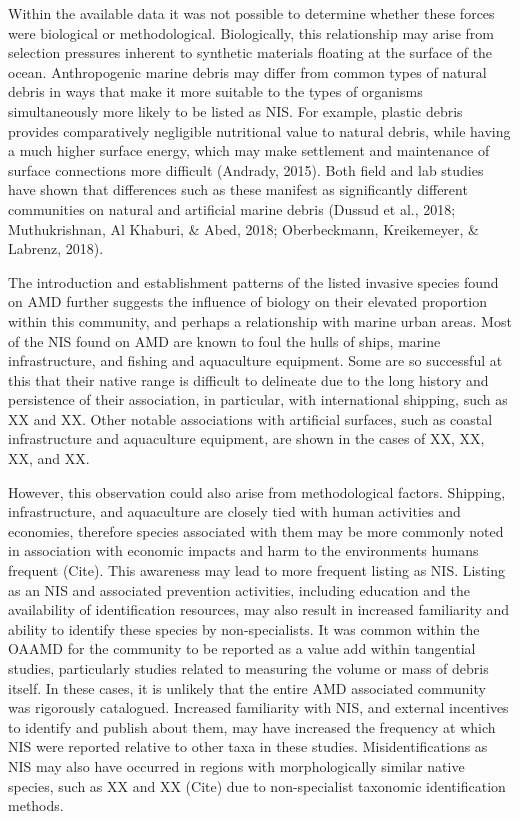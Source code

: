 \documentclass[a4paper, nobind]{templates/ociamthesis}
\begin{document}
Within the available data it was not possible to determine whether these forces were biological or methodological. Biologically, this relationship may arise from selection pressures inherent to synthetic materials floating at the surface of the ocean. Anthropogenic marine debris may differ from common types of natural debris in ways that make it more suitable to the types of organisms simultaneously more likely to be listed as NIS. For example, plastic debris provides comparatively negligible nutritional value to natural debris, while having a much higher surface energy, which may make settlement and maintenance of surface connections more difficult (Andrady, 2015). Both field and lab studies have shown that differences such as these manifest as significantly different communities on natural and artificial marine debris (Dussud et al., 2018; Muthukrishnan, Al Khaburi, \& Abed, 2018; Oberbeckmann, Kreikemeyer, \& Labrenz, 2018).

The introduction and establishment patterns of the listed invasive species found on AMD further suggests the influence of biology on their elevated proportion within this community, and perhaps a relationship with marine urban areas. Most of the NIS found on AMD are known to foul the hulls of ships, marine infrastructure, and fishing and aquaculture equipment. Some are so successful at this that their native range is difficult to delineate due to the long history and persistence of their association, in particular, with international shipping, such as XX and XX. Other notable associations with artificial surfaces, such as coastal infrastructure and aquaculture equipment, are shown in the cases of XX, XX, XX, and XX.

However, this observation could also arise from methodological factors. Shipping, infrastructure, and aquaculture are closely tied with human activities and economies, therefore species associated with them may be more commonly noted in association with economic impacts and harm to the environments humans frequent (Cite). This awareness may lead to more frequent listing as NIS. Listing as an NIS and associated prevention activities, including education and the availability of identification resources, may also result in increased familiarity and ability to identify these species by non-specialists.
It was common within the OAAMD for the community to be reported as a value add within tangential studies, particularly studies related to measuring the volume or mass of debris itself. In these cases, it is unlikely that the entire AMD associated community was rigorously catalogued. Increased familiarity with NIS, and external incentives to identify and publish about them, may have increased the frequency at which NIS were reported relative to other taxa in these studies. Misidentifications as NIS may also have occurred in regions with morphologically similar native species, such as XX and XX (Cite) due to non-specialist taxonomic identification methods.
\end{document}

